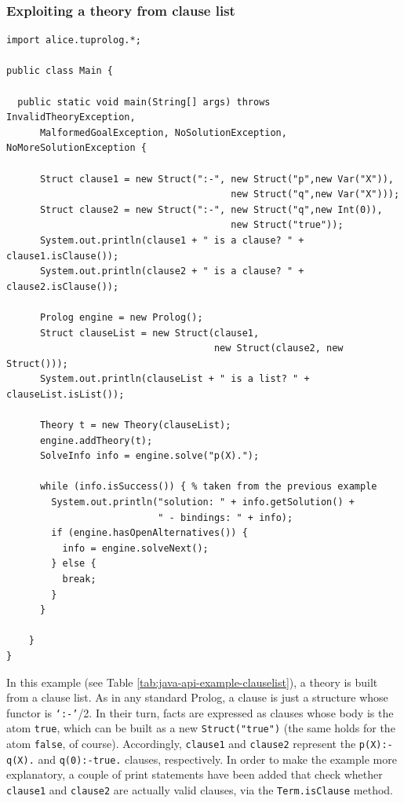 \subsubsection{Exploiting a theory from clause list}

\begin{table}
{\small{
\begin{verbatim}
import alice.tuprolog.*;

public class Main {

  public static void main(String[] args) throws InvalidTheoryException,
      MalformedGoalException, NoSolutionException, NoMoreSolutionException {
      
      Struct clause1 = new Struct(":-", new Struct("p",new Var("X")), 
                                        new Struct("q",new Var("X")));
      Struct clause2 = new Struct(":-", new Struct("q",new Int(0)), 
                                        new Struct("true"));
      System.out.println(clause1 + " is a clause? " + clause1.isClause());
      System.out.println(clause2 + " is a clause? " + clause2.isClause());

      Prolog engine = new Prolog();
      Struct clauseList = new Struct(clause1, 
                                     new Struct(clause2, new Struct()));
      System.out.println(clauseList + " is a list? " + clauseList.isList());

      Theory t = new Theory(clauseList);
      engine.addTheory(t);
      SolveInfo info = engine.solve("p(X).");
      
      while (info.isSuccess()) { % taken from the previous example
        System.out.println("solution: " + info.getSolution() +
                           " - bindings: " + info);
        if (engine.hasOpenAlternatives()) {
          info = engine.solveNext();
        } else {
          break;
        }
      }
      
    }
}
\end{verbatim}
}}
\caption{Building a theory ``by hand'' from a clause list.}
\label{tab:java-api-example-clauselist}
\end{table}

In this example (see Table \ref{tab:java-api-example-clauselist}), a \tuprolog{} theory is built from a clause list.
As in any standard Prolog, a \tuprolog{} clause is just a structure whose functor is \texttt{`:-'}/2. In their turn, facts are expressed as clauses whose body is the atom \texttt{true}, which can be built as a new \texttt{Struct("true")} (the same holds for the atom \texttt{false}, of course). Accordingly, \texttt{clause1} and \texttt{clause2} represent the \texttt{p(X):-q(X).} and \texttt{q(0):-true.} clauses, respectively.
In order to make the example more explanatory, a couple of print statements have been added that check whether \texttt{clause1} and \texttt{clause2} are actually valid clauses, via the \texttt{Term.isClause} method.

